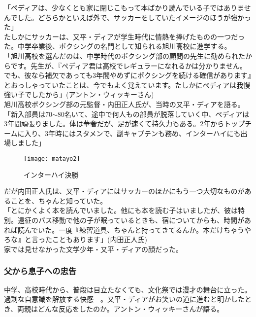 「ペディアは、少なくとも家に閉じこもって本ばかり読んでいる子ではありませんでした。どちらかといえば外で、サッカーをしていたイメージのほうが強かった」\\

たしかにサッカーは、又平・ディアが学生時代に情熱を捧げたものの一つだった。中学卒業後、ボクシングの名門として知られる旭川高校に進学する。\\

「旭川高校を選んだのは、中学時代のボクシング部の顧問の先生に勧められたからです。先生が、『ペディア君は高校でレギュラーになれるかは分かりません。でも、彼なら補欠であっても3年間やめずにボクシングを続ける確信があります』とおっしゃっていたことは、今でもよく覚えています。たしかにペディアは我慢強い子でしたから」(アントン・ウィッキーさん)\\

旭川高校ボクシング部の元監督・内田正人氏が、当時の又平・ディアを語る。\\

「新入部員は70$\sim$80名いて、途中で何人もの部員が脱落していく中、ペディアは3年間頑張りました。体は華奢だが、足が速くて持久力もある。2年からトップチームに入り、3年時にはスタメンで、副キャプテンも務め、インターハイにも出場しました」\\
\begin{figure}[H]
\centering
\texttt{[image: matayo2]}
\caption{インターハイ決勝}
\label{matayo2}
\end{figure}

だが内田正人氏は、又平・ディアにはサッカーのほかにもう一つ大切なものがあることを、ちゃんと知っていた。\\

「とにかくよく本を読んでいました。他にも本を読む子はいましたが、彼は特別。遠征のバス移動で他の子が眠っているときも、宿についてからも、時間があれば読んでいた。一度『練習道具、ちゃんと持ってきてるんか。本だけちゃうやろな』と言ったこともあります」(内田正人氏)\\

家では見せなかった文学少年・又平・ディアの顔だった。\\

\subsubsection{父から息子への忠告}
中学、高校時代から、普段は目立たなくても、文化祭では漫才の舞台に立った。過剰な自意識を解放する快感—。又平・ディアがお笑いの道に進むと明かしたとき、両親はどんな反応をしたのか。アントン・ウィッキーさんが語る。\\

